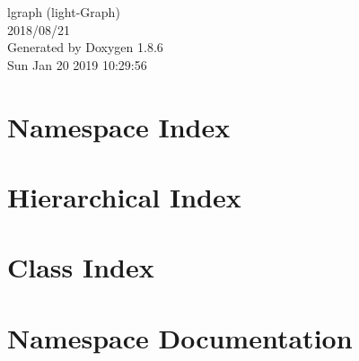 \documentclass[twoside]{book}
\newcommand{\clearemptydoublepage}{%
  \newpage{\pagestyle{empty}\cleardoublepage}%
}
\begin{document}
\hypersetup{pageanchor=false}
\begin{titlepage}
\vspace*{7cm}
\begin{center}%
{\Large lgraph (light-\/\-Graph) \\[1ex]\large 2018/08/21 }\\
\vspace*{1cm}
{\large Generated by Doxygen 1.8.6}\\
\vspace*{0.5cm}
{\small Sun Jan 20 2019 10:29:56}\\
\end{center}
\end{titlepage}
\clearemptydoublepage
\tableofcontents
\clearemptydoublepage
{}
\hypersetup{pageanchor=true}

\chapter{Namespace Index}

\chapter{Hierarchical Index}

\chapter{Class Index}

\chapter{Namespace Documentation}





















\end{document}

